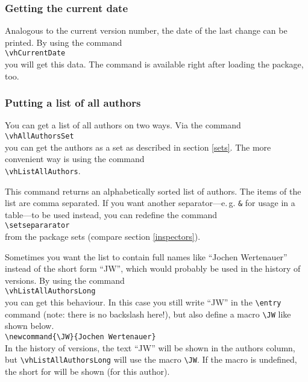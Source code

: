 \subsubsection{Getting the current date}
Analogous to the current version number, the date of the last change can be printed. By using the command\\
\mbox{}\hspace{2em}\verb|\vhCurrentDate|\\
you will get this data. The command is available right after loading the package, too.

\subsubsection{Putting a list of all authors}
You can get a list of all authors on two ways. Via the command\\
\mbox{}\hspace{2em}\verb|\vhAllAuthorsSet|\\
you can get the authors as a set as described in section \ref{sets}. The more convenient way is using the command\\
\mbox{}\hspace{2em}\verb|\vhListAllAuthors|.

This command returns an alphabetically sorted list of authors. The items of the list are comma separated. If you want another separator---e.\,g. \texttt{\&} for usage in a table---to be used instead, you can redefine the command\\
\mbox{}\hspace{2em}\verb|\setsepararator|\\
from the package sets (compare section \ref{inspectors}).

Sometimes you want the list to contain full names like ``Jochen Wer\-ten\-au\-er'' instead of the short form ``JW'', which would probably be used in the history of versions. By using the command\\
\mbox{}\hspace{2em}\verb|\vhListAllAuthorsLong|\\
you can get this behaviour. In this case you still write ``JW'' in the \verb|\entry| command (note: there is no backslash here!), but also define a macro \verb|\JW| like shown below.\\
\mbox{}\hspace{2em}\verb|\newcommand{\JW}{Jochen Wertenauer}|\\
In the history of versions, the text ``JW'' will be shown in the authors column, but  \verb|\vhListAllAuthorsLong| will use the macro \verb|\JW|. If the macro is undefined, the short for will be shown (for this author).

